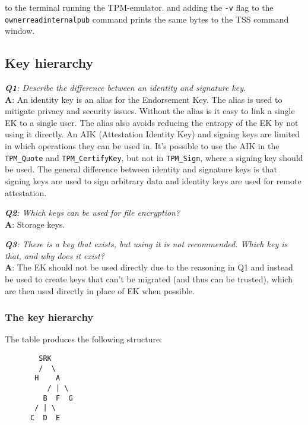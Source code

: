 \documentclass[10pt]{article}
\newcommand{\command}[1]{\texttt{#1}}
\newcommand{\Q}[2]{\textit{\textbf{Q#1}: #2}}
\newcommand{\A}[1]{\textbf{A}: #1}
\begin{document}
      to the terminal running the TPM-emulator.
      and adding the \command{-v} flag to the \\
      \command{ownerreadinternalpub} command
      prints the same bytes to the TSS command window.

  \subsection{Key hierarchy}

    \Q{1}{Describe the difference between an identity and signature key.}\\
    \A{
      An identity key is an alias for the Endorsement Key. The alias is used
      to mitigate privacy and security issues. Without the alias is it easy to
      link a single EK to a single user. The alias also avoids reducing the
      entropy of the EK by not using it directly. An AIK (Attestation Identity
      Key) and signing keys are limited in which operations they can be used
      in. It's possible to use the AIK in the \command{TPM\_Quote} and
      \command{TPM\_CertifyKey}, but not in \command{TPM\_Sign}, where a
      signing key should be used. The general difference between identity and
      signature keys is that signing keys are used to sign arbitrary data and
      identity keys are used for remote attestation.
  }

    \Q{2}{Which keys can be used for file encryption?}\\
    \A{Storage keys.}

    \Q{3}{
      There is a key that exists, but using it is not recommended. Which key
      is that, and why does it exist?
    }\\
    \A{
      The EK should not be used directly due to the reasoning in Q1 and
      instead be used to create keys that can't be migrated (and thus can be
      trusted), which are then used directly in place of EK when possible.
    }

    \subsubsection{The key hierarchy}

    The table produces the following structure:

\begin{lstlisting}
        SRK
        /  \
       H    A
          / | \
         B  F  G
       / | \
      C  D  E
\end{lstlisting}
\end{document}
